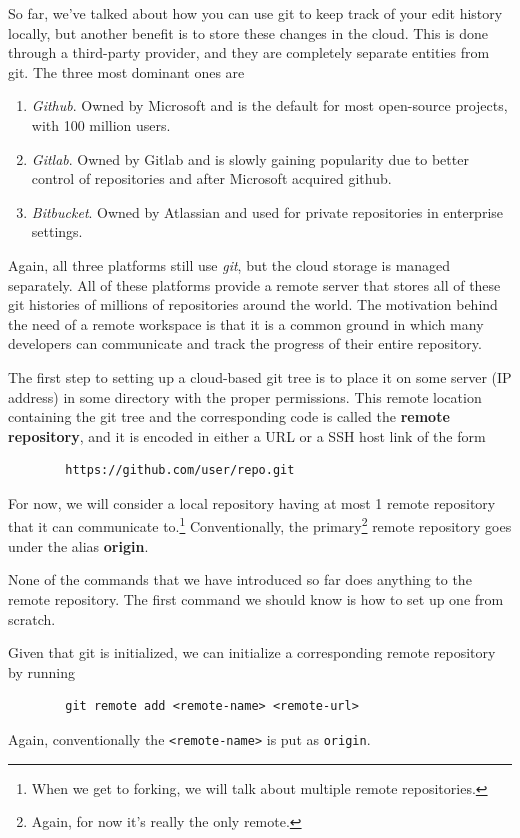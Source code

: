 \documentclass{article}
\begin{document}
    So far, we've talked about how you can use git to keep track of your edit history locally, but another benefit is to store these changes in the cloud. This is done through a third-party provider, and they are completely separate entities from git. The three most dominant ones are  
    \begin{enumerate}
      \item \textit{Github}. Owned by Microsoft and is the default for most open-source projects, with 100 million users. 
      \item \textit{Gitlab}. Owned by Gitlab and is slowly gaining popularity due to better control of repositories and after Microsoft acquired github. 
      \item \textit{Bitbucket}. Owned by Atlassian and used for private repositories in enterprise settings. 
    \end{enumerate}
    Again, all three platforms still use \textit{git}, but the cloud storage is managed separately. All of these platforms provide a remote server that stores all of these git histories of millions of repositories around the world. The motivation behind the need of a remote workspace is that it is a common ground in which many developers can communicate and track the progress of their entire repository. 

    \begin{definition}
      The first step to setting up a cloud-based git tree is to place it on some server (IP address) in some directory with the proper permissions. This remote location containing the git tree and the corresponding code is called the \textbf{remote repository}, and it is encoded in either a URL or a SSH host link of the form 
      \begin{lstlisting}
        https://github.com/user/repo.git
      \end{lstlisting} 
      For now, we will consider a local repository having at most 1 remote repository that it can communicate to.\footnote{When we get to forking, we will talk about multiple remote repositories.} Conventionally, the primary\footnote{Again, for now it's really the only remote.} remote repository goes under the alias \textbf{origin}. 
    \end{definition}  

    None of the commands that we have introduced so far does anything to the remote repository. The first command we should know is how to set up one from scratch. 

    \begin{definition}
      Given that git is initialized, we can initialize a corresponding remote repository by running 
      \begin{lstlisting}
        git remote add <remote-name> <remote-url>
      \end{lstlisting}
      Again, conventionally the \texttt{<remote-name>} is put as \texttt{origin}. 
    \end{definition} 
\end{document}
